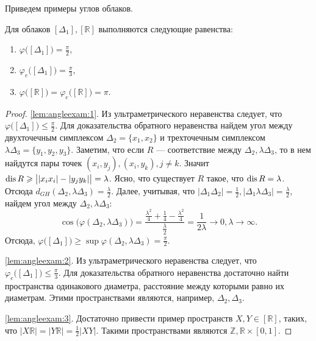 Приведем примеры углов облаков.
\begin{lemma}
    Для облаков \( [\Delta _{1}], [\mathbb{R}] \) выполняются следующие
    равенства: \label{lem:angleexam}
    \begin{enumerate}
        \item \( \varphi \big([\Delta _{1}]\big) = \frac{\pi }{2}
            \),\label{lem:angleexam:1}
        \item \( \varphi_e \big([\Delta _{1}]\big) = \frac{\pi }{3}
            \),\label{lem:angleexam:2}
        \item \( \varphi \big([\mathbb{R}]\big) = \varphi_e
            \big([\mathbb{R}]\big) = \pi  \).\label{lem:angleexam:3}
    \end{enumerate}
\end{lemma}
\begin{proof}
    \ref{lem:angleexam:1}. Из ультраметрического неравенства следует, что \(
    \varphi \big([\Delta _1]\big)\le \frac{\pi }{2} \). Для доказательства
    обратного неравенства найдем угол между двухточечным симплексом \( \Delta
    _{2} = \{x_1, x_2\} \) и трехточечным симплексом \(
    \lambda \Delta _3  = \{y_1,y_2, y_3\}\). Заметим, что если \( R
    \) --- соответствие между \( \Delta _2, \lambda \Delta _3 \),
    то в нем найдутся пары точек \( (x_i,y_j), (x_i,y_k), j \neq k
    \). Значит \( \operatorname{dis} R \geqslant \big||x_ix_i|-|y_jy_k|\big|  = \lambda
    \). Ясно, что существует \( R \) такое, что \( \operatorname{dis} R = \lambda
    \). Отсюда \( d _{GH}(\Delta _2, \lambda \Delta _3) =
    \frac{\lambda }{2} \). Далее, учитывая, что \( |\Delta _1
    \Delta _2|=\frac{1}{2}, |\Delta _1 \lambda \Delta
    _3|=\frac{\lambda }{2} \), найдем угол между \( \Delta _2,
    \lambda \Delta _3 \):
    \[ \cos \big(\varphi (\Delta _2 , \lambda \Delta _3)\big)
        =\frac{\frac{\lambda ^2}{4} + \frac{1}{4} - \frac{\lambda
        ^2}{4}}{\frac{\lambda }{2}} = \frac{1}{2 \lambda }
        \rightarrow 0, \lambda \rightarrow \infty.
    \]
    Отсюда, \( \varphi \big([\Delta _1]\big) \ge \sup \varphi (\Delta _2,
    \lambda \Delta _3) = \frac \pi 2. \)

    \ref{lem:angleexam:2}. Из ультраметрического неравенства следует, что \(
    \varphi_e \big([\Delta _1]\big)\le \frac{\pi }{3} \). Для доказательства
    обратного неравенства достаточно найти пространства одинакового диаметра,
    расстояние между которыми равно их диаметрам. Этими пространствами
    являются, например, \( \Delta _2, \Delta _3 \).

    \ref{lem:angleexam:3}. Достаточно привести пример пространств \( X,Y\in
    [\mathbb{R}] \), таких, что \( |X \mathbb{R}| = |Y \mathbb{R}| = \frac 1 2
    |XY|. \) Такими пространствами являются \( \mathbb{Z}, \mathbb{R}\times
    [0,1] \).

\end{proof}
